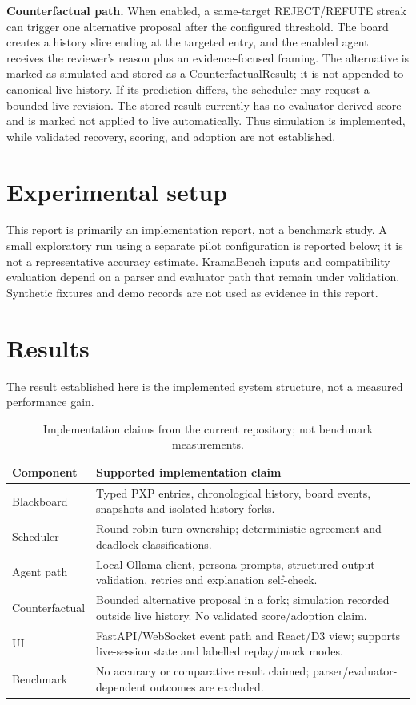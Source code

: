 \documentclass[11pt,a4paper,twocolumn]{article}
\begin{document}
\textbf{Counterfactual path.} When enabled, a same-target REJECT/REFUTE streak can trigger one alternative proposal after the configured threshold. The board creates a history slice ending at the targeted entry, and the enabled agent receives the reviewer's reason plus an evidence-focused framing. The alternative is marked as simulated and stored as a CounterfactualResult; it is not appended to canonical live history. If its prediction differs, the scheduler may request a bounded live revision. The stored result currently has no evaluator-derived score and is marked not applied to live automatically. Thus simulation is implemented, while validated recovery, scoring, and adoption are not established.

\section{Experimental setup}
This report is primarily an implementation report, not a benchmark study. A small exploratory run using a separate pilot configuration is reported below; it is not a representative accuracy estimate. KramaBench inputs and compatibility evaluation depend on a parser and evaluator path that remain under validation. Synthetic fixtures and demo records are not used as evidence in this report.

\section{Results}
The result established here is the implemented system structure, not a measured performance gain.

\begin{table}[h]
\centering
\small
\begin{tabularx}{\columnwidth}{@{}lX@{}}
\toprule
Component & Supported implementation claim \\
\midrule
Blackboard & Typed PXP entries, chronological history, board events, snapshots and isolated history forks. \\
Scheduler & Round-robin turn ownership; deterministic agreement and deadlock classifications. \\
Agent path & Local Ollama client, persona prompts, structured-output validation, retries and explanation self-check. \\
Counterfactual & Bounded alternative proposal in a fork; simulation recorded outside live history. No validated score/adoption claim. \\
UI & FastAPI/WebSocket event path and React/D3 view; supports live-session state and labelled replay/mock modes. \\
Benchmark & No accuracy or comparative result claimed; parser/evaluator-dependent outcomes are excluded. \\
\bottomrule
\end{tabularx}
\caption{Implementation claims from the current repository; not benchmark measurements.}
\label{tab:implementation}
\end{table}
\end{document}
